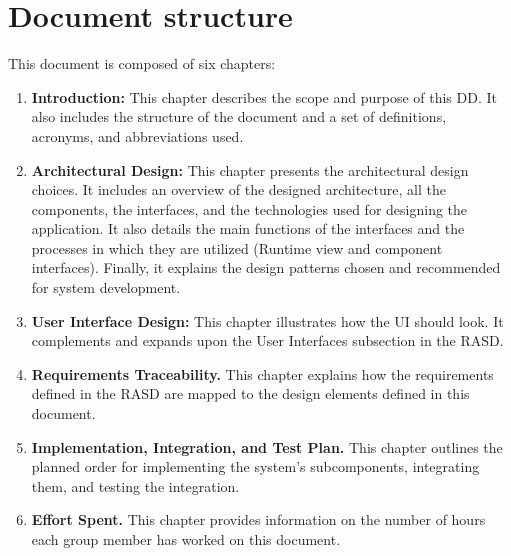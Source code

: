\pagebreak
\section{Document structure}
This document is composed of six chapters:
\begin{enumerate}
    \item \textbf{ Introduction:} This chapter describes the scope and purpose of this DD. It also includes the structure of the document and a set of definitions, acronyms, and abbreviations used.
    \item \textbf{ Architectural Design:} This chapter presents the architectural design choices. It includes an overview of the designed architecture, all the components, the interfaces, and the technologies used for designing the application. It also details the main functions of the interfaces and the processes in which they are utilized (Runtime view and component interfaces). Finally, it explains the design patterns chosen and recommended for system development.
    \item \textbf{User Interface Design:} This chapter illustrates how the UI should look. It complements and expands upon the User Interfaces subsection in the RASD.
    \item \textbf{Requirements Traceability.} This chapter explains how the requirements defined in the RASD are mapped to the design elements defined in this document.
    \item \textbf{Implementation, Integration, and Test Plan.} This chapter outlines the planned order for implementing the system's subcomponents, integrating them, and testing the integration.
    \item \textbf{Effort Spent.} This chapter provides information on the number of hours each group member has worked on this document.
\end{enumerate}

